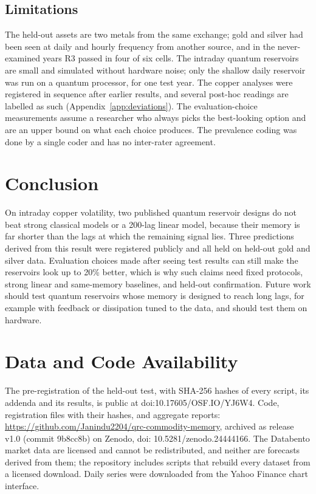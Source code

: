 \documentclass{ieeeaccess}
\begin{document}
\subsection{Limitations}
The held-out assets are two metals from the same exchange; gold and silver had been seen at daily and hourly frequency from another source, and in the never-examined years R3 passed in four of six cells. The intraday quantum reservoirs are small and simulated without hardware noise; only the shallow daily reservoir was run on a quantum processor, for one test year. The copper analyses were registered in sequence after earlier results, and several post-hoc readings are labelled as such (Appendix~\ref{app:deviations}). The evaluation-choice measurements assume a researcher who always picks the best-looking option and are an upper bound on what each choice produces. The prevalence coding was done by a single coder and has no inter-rater agreement.

\section{Conclusion}
\label{sec:conclusion}
On intraday copper volatility, two published quantum reservoir designs do not beat strong classical models or a 200-lag linear model, because their memory is far shorter than the lags at which the remaining signal lies. Three predictions derived from this result were registered publicly and all held on held-out gold and silver data. Evaluation choices made after seeing test results can still make the reservoirs look up to 20\% better, which is why such claims need fixed protocols, strong linear and same-memory baselines, and held-out confirmation. Future work should test quantum reservoirs whose memory is designed to reach long lags, for example with feedback or dissipation tuned to the data, and should test them on hardware.

\section*{Data and Code Availability}
The pre-registration of the held-out test, with SHA-256 hashes of every script, its addenda and its results, is public at doi:10.17605/OSF.IO/YJ6W4. Code, registration files with their hashes, and aggregate reports: \url{https://github.com/Janindu2204/qrc-commodity-memory}, archived as release v1.0 (commit 9b8cc8b) on Zenodo, doi: 10.5281/zenodo.24444166. The Databento market data are licensed and cannot be redistributed, and neither are forecasts derived from them; the repository includes scripts that rebuild every dataset from a licensed download. Daily series were downloaded from the Yahoo Finance chart interface.
\end{document}

